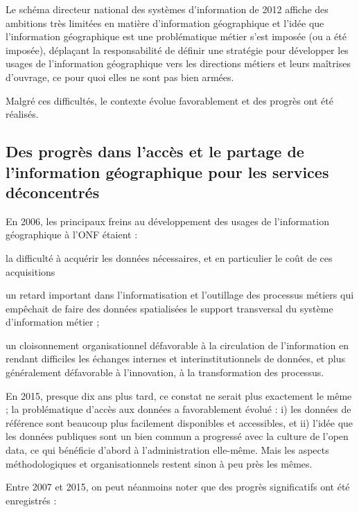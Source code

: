 Le schéma directeur national des systèmes d'information de 2012
affiche des ambitions très limitées en matière d'information géographique
et l'idée que l'information géographique est une problématique
métier s'est imposée (ou a été imposée),
déplaçant la responsabilité de définir une stratégie
pour développer les usages de l'information géographique
vers les directions métiers et leurs maîtrises d'ouvrage,
ce pour quoi elles ne sont pas bien armées.

Malgré ces difficultés, le contexte évolue favorablement
et des progrès ont été réalisés.


\subsection[constats:progres]
{Des progrès dans l'accès et le partage de l'information géographique pour les
services déconcentrés}


En 2006, les principaux freins au développement
des usages de l'information géographique à l'ONF étaient :

\startitemize

\item la difficulté à acquérir les données nécessaires,
      et en particulier le coût de ces acquisitions

\item un retard important dans l'informatisation et l'outillage
      des processus métiers qui empêchait de faire
      des données spatialisées le support transversal
      du système d'information métier ;

\item un cloisonnement organisationnel défavorable
      à la circulation de l'information en rendant difficiles
      les échanges internes et interinstitutionnels de
      données, et plus généralement défavorable à l'innovation,
      à la transformation des processus.

\stopitemize

En 2015, presque dix ans plus tard, ce constat ne serait plus exactement le
même ; la problématique d'accès aux données a favorablement évolué :
i) les données de référence sont beaucoup plus facilement disponibles et
accessibles, et ii) l'idée que les données publiques sont un bien commun a
progressé avec la culture de l'open data, ce qui bénéficie d'abord à
l'administration elle-même. Mais les aspects méthodologiques et
organisationnels restent sinon à peu près les mêmes.

Entre 2007 et 2015, on peut néanmoins noter que des progrès significatifs ont
été enregistrés :


